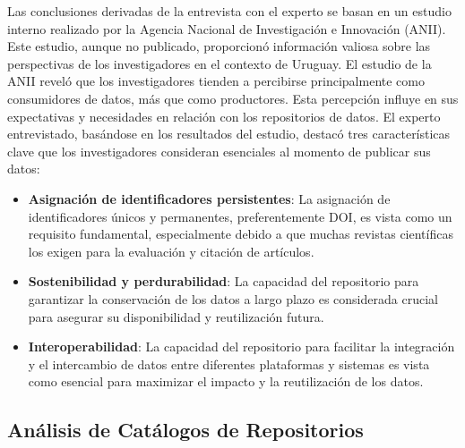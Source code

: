 \documentclass[runningheads]{llncs}
\begin{document}
Las conclusiones derivadas de la entrevista con el experto se basan en un estudio interno realizado por la Agencia Nacional de Investigación e Innovación (ANII). Este estudio, aunque no publicado, proporcionó información valiosa sobre las perspectivas de los investigadores en el contexto de Uruguay.
El estudio de la ANII reveló que los investigadores tienden a percibirse principalmente como consumidores de datos, más que como productores. Esta percepción influye en sus expectativas y necesidades en relación con los repositorios de datos.
El experto entrevistado, basándose en los resultados del estudio, destacó tres características clave que los investigadores consideran esenciales al momento de publicar sus datos:
\begin{itemize}
    \item \textbf{Asignación de identificadores persistentes}: La asignación de identificadores únicos y permanentes, preferentemente DOI, es vista como un requisito fundamental, especialmente debido a que muchas revistas científicas los exigen para la evaluación y citación de artículos.
    \item \textbf{Sostenibilidad y perdurabilidad}: La capacidad del repositorio para garantizar la conservación de los datos a largo plazo es considerada crucial para asegurar su disponibilidad y reutilización futura.
    \item \textbf{Interoperabilidad}: La capacidad del repositorio para facilitar la integración y el intercambio de datos entre diferentes plataformas y sistemas es vista como esencial para maximizar el impacto y la reutilización de los datos.
\end{itemize}

\subsection{Análisis de Catálogos de Repositorios}
\end{document}
